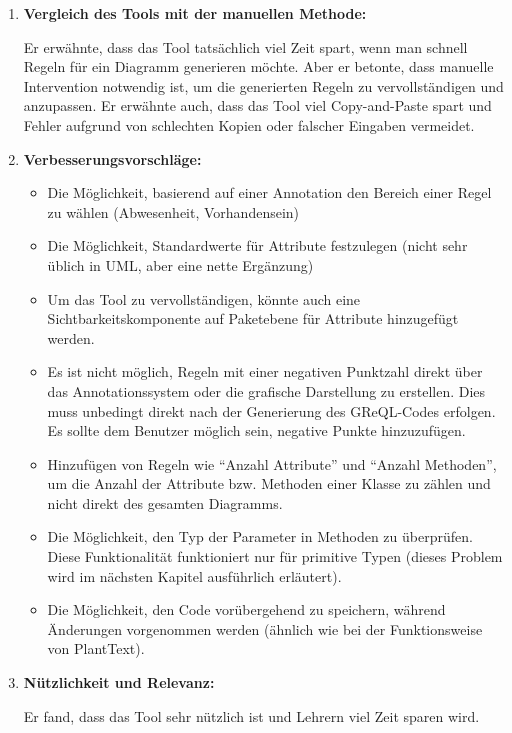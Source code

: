 \begin{enumerate}[itemsep=8pt, parsep=5pt]
    \item \textbf{Vergleich des Tools mit der manuellen Methode:}

    Er erwähnte, dass das Tool tatsächlich viel Zeit spart, wenn man schnell Regeln für ein Diagramm generieren möchte.
    Aber er betonte, dass manuelle Intervention notwendig ist, um die generierten Regeln zu vervollständigen und
    anzupassen. Er erwähnte auch, dass das Tool viel Copy-and-Paste spart und Fehler aufgrund von schlechten Kopien
    oder falscher Eingaben vermeidet.

    \item \textbf{Verbesserungsvorschläge:}

    \begin{itemize}[itemsep=8pt, parsep=5pt]
        \item Die Möglichkeit, basierend auf einer Annotation den Bereich einer Regel zu wählen
        (Abwesenheit, Vorhandensein)
        \item Die Möglichkeit, Standardwerte für Attribute festzulegen (nicht sehr üblich in UML, aber eine nette
        Ergänzung)
        \item Um das Tool zu vervollständigen, könnte auch eine Sichtbarkeitskomponente auf Paketebene für Attribute
        hinzugefügt werden.
        \item Es ist nicht möglich, Regeln mit einer negativen Punktzahl direkt über das Annotationssystem oder die
        grafische Darstellung zu erstellen. Dies muss unbedingt direkt nach der Generierung des GReQL-Codes erfolgen.
        Es sollte dem Benutzer möglich sein, negative Punkte hinzuzufügen.
        \item Hinzufügen von Regeln wie ``Anzahl Attribute'' und ``Anzahl Methoden'', um die Anzahl der Attribute bzw.
        Methoden einer Klasse zu zählen und nicht direkt des gesamten Diagramms.
        \item Die Möglichkeit, den Typ der Parameter in Methoden zu überprüfen. Diese Funktionalität funktioniert nur
        für primitive Typen (dieses Problem wird im nächsten Kapitel ausführlich erläutert).
        \item Die Möglichkeit, den Code vorübergehend zu speichern, während Änderungen vorgenommen werden (ähnlich wie
        bei der Funktionsweise von PlantText).
    \end{itemize}

    \item \textbf{Nützlichkeit und Relevanz:}

    Er fand, dass das Tool sehr nützlich ist und Lehrern viel Zeit sparen wird.


\end{enumerate}
